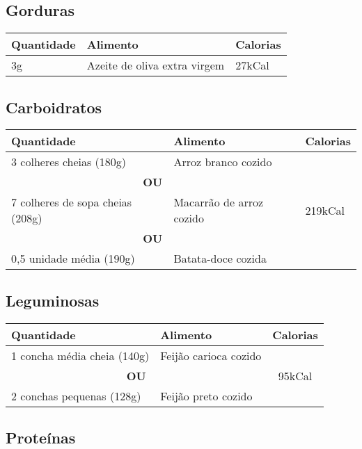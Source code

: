 \subsection*{Gorduras}
\begin{tabular}{p{8cm}p{8cm}p{1.5cm}}
\toprule
\textbf{Quantidade} & \textbf{Alimento} & \textbf{Calorias} \\
\midrule
3g & Azeite de oliva extra virgem & 27kCal \\
\bottomrule
\end{tabular}

\subsection*{Carboidratos}

\begin{tabular}{p{8cm}p{8cm}p{1.5cm}}
\toprule
\textbf{Quantidade} & \textbf{Alimento} & \textbf{Calorias} \\
\midrule
3 colheres cheias (180g) & Arroz branco cozido  & \multirow{6}{*}{219kCal}  \\
\cmidrule(lr){1-2}
\multicolumn{2}{c}{\textbf{OU}} \\
\cmidrule(lr){1-2}
7 colheres de sopa cheias (208g) & Macarrão de arroz cozido \\
\cmidrule(lr){1-2}
\multicolumn{2}{c}{\textbf{OU}} \\
\cmidrule(lr){1-2}
0,5 unidade média (190g) & Batata-doce cozida \\
\bottomrule
\end{tabular}

\subsection*{Leguminosas}

\begin{tabular}{p{8cm}p{8cm}c}
\toprule
\textbf{Quantidade} & \textbf{Alimento} & \textbf{Calorias} \\
\midrule
1 concha média cheia (140g) & Feijão carioca cozido & \multirow{4}{*}{95kCal} \\
\cmidrule(lr){1-2}
\multicolumn{2}{c}{\textbf{OU}} \\
\cmidrule(lr){1-2}
2 conchas pequenas (128g) & Feijão preto cozido & \\
\bottomrule
\end{tabular}

\subsection*{Proteínas}

